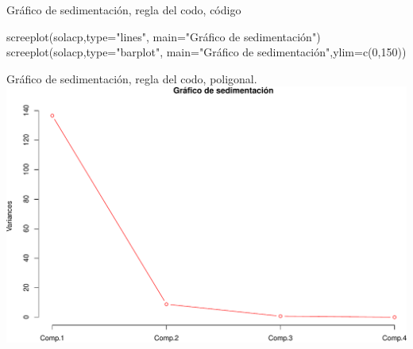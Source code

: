 \documentclass[
  ignorenonframetext,
]{beamer}
\newenvironment{Shaded}{\begin{snugshade}}{\end{snugshade}}
\newcommand{\AttributeTok}[1]{\textcolor[rgb]{0.77,0.63,0.00}{#1}}
\newcommand{\DecValTok}[1]{\textcolor[rgb]{0.00,0.00,0.81}{#1}}
\newcommand{\FunctionTok}[1]{\textcolor[rgb]{0.00,0.00,0.00}{#1}}
\newcommand{\NormalTok}[1]{#1}
\newcommand{\StringTok}[1]{\textcolor[rgb]{0.31,0.60,0.02}{#1}}
\begin{document}
\begin{frame}[fragile]{Gráfico de sedimentación, regla del codo, código}
\protect\hypertarget{gruxe1fico-de-sedimentaciuxf3n-regla-del-codo-cuxf3digo}{}
\begin{Shaded}
\begin{Highlighting}[]
\FunctionTok{screeplot}\NormalTok{(solacp,}\AttributeTok{type=}\StringTok{"lines"}\NormalTok{,}
          \AttributeTok{main=}\StringTok{"Gráfico de sedimentación"}\NormalTok{)}
\FunctionTok{screeplot}\NormalTok{(solacp,}\AttributeTok{type=}\StringTok{"barplot"}\NormalTok{,}
          \AttributeTok{main=}\StringTok{"Gráfico de sedimentación"}\NormalTok{,}\AttributeTok{ylim=}\FunctionTok{c}\NormalTok{(}\DecValTok{0}\NormalTok{,}\DecValTok{150}\NormalTok{))}
\end{Highlighting}
\end{Shaded}
\end{frame}

\begin{frame}{Gráfico de sedimentación, regla del codo, poligonal.}
\protect\hypertarget{gruxe1fico-de-sedimentaciuxf3n-regla-del-codo-poligonal.}{}
\includegraphics{AnalisisComponentesPrincipales_fusion_files/figure-beamer/screeplotlines-1.pdf}
\end{frame}
\end{document}

